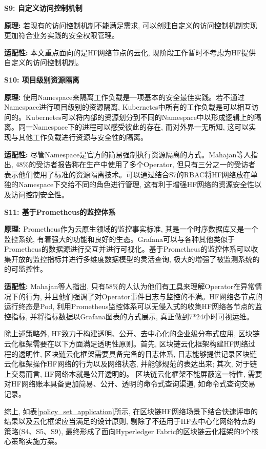 \textbf{S9: 自定义访问控制机制}

\textbf{原理: }若现有的访问控制机制不能满足需求, 可以创建自定义的访问控制机制实现更加符合业务实践的安全权限管理。

\textbf{适配性: }本文重点面向的是HF网络节点的云化, 现阶段工作暂时不考虑为HF提供自定义的访问控制机制。


\textbf{S10: 项目级别资源隔离}

\textbf{原理: }使用Namespace来隔离工作负载是一项基本的安全最佳实践。若不通过Namespace进行项目级别的资源隔离, Kubernetes中所有的工作负载是可以相互访问的。Kubernetes可以将内部的资源划分到不同的Namespace中以形成逻辑上的隔离。同一Namespace下的进程可以感受彼此的存在, 而对外界一无所知, 这可以实现与其他工作负载进行资源与安全性的隔离。

\textbf{适配性: }尽管Namespace是官方的简易强制执行资源隔离的方式。Mahajan等人\cite{mahajan2020suture}指出, 48\%的受访者报告称在生产中使用了多个Operator, 但只有三分之一的受访者表示他们使用了标准的资源隔离技术。可以通过结合S7的RBAC将HF网络放在单独的Namespace下交给不同的角色进行管理, 这有利于增强HF网络的资源安全性以及访问控制安全性。

\textbf{S11: 基于Prometheus的监控体系}

\textbf{原理: }Prometheus\cite{sukhija2019towards}作为云原生领域的监控事实标准, 其是一个时序数据库又是一个监控系统, 有着强大的功能和良好的生态。Grafana可以与各种其他类似于Prometheus的数据源进行交互并进行可视化。基于Prometheus的监控体系可以收集开放的监控指标并进行多维度数据模型的灵活查询, 极大的增强了被监测系统的的可监控性。

\textbf{适配性: } Mahajan等人\cite{mahajan2020suture}指出, 只有58\%的人认为他们有工具来理解Operator在异常情况下的行为, 并且他们强调了对Operator事件日志与监控的不满。HF网络各节点的运行终态是Pod, 利用Prometheus监控体系可以无侵入式的收集HF网络各节点的监控指标, 并将指标数据以Grafana图表的方式展示, 真正做到7*24小时可视运维。

除上述策略外, HF致力于构建透明、公开、去中心化的企业级分布式应用, 区块链云化框架需要在以下方面满足透明性原则。首先, 区块链云化框架构建HF网络过程的透明性, 区块链云化框架需要具备完备的日志体系, 日志能够提供记录区块链云化框架操作HF网络的行为以及网络状态, 并能够规范的表达出来; 其次, 对于链上交易而言, HF网络本就是公开透明的。 区块链云化框架不能屏蔽这一特性, 需要对HF网络账本具备更加简易、公开、透明的命令式查询渠道, 如命令式查询交易记录。

综上, 如表\ref{policy_set_application}所示, 在区块链HF网络场景下结合快速评审的结果以及云化框架应当满足的设计原则, 剔除了不适用于HF去中心化网络特点的策略(S4、S5、S9), 最终形成了面向Hyperledger Fabric的区块链云化框架的9个核心策略实施方案。


